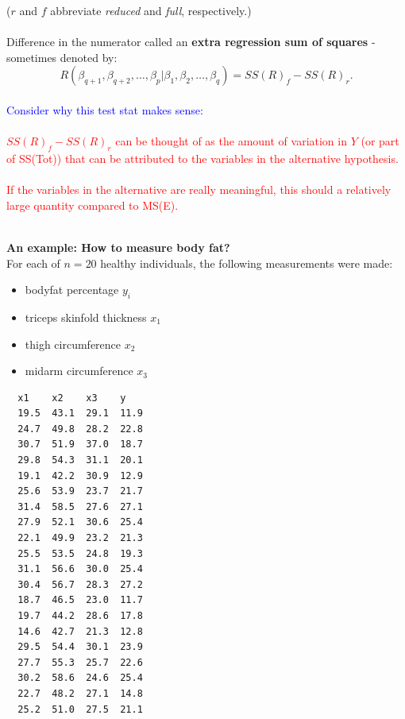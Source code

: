 ($r$ and $f$ abbreviate {\em reduced} and {\em full}, respectively.)\\~\\

Difference in the numerator called an \textbf{extra regression sum of squares} - sometimes denoted by:
$$ R(\beta_{q+1},\beta_{q+2},\ldots,\beta_p|\beta_{1},\beta_{2},\ldots,\beta_q) = SS(R)_f-SS(R)_r.$$~\\

\textcolor{blue}{Consider why this test stat makes sense:}\\~\\
\textcolor{red}{$SS(R)_f-SS(R)_r$ can be thought of as the amount of variation in $Y$ (or part of SS(Tot)) that can be attributed to the variables in the alternative hypothesis.  \\~\\
If the variables in the alternative are really meaningful, this should a relatively large quantity compared to MS(E).}\\~\\

\newpage

\textbf{An example: How to measure body fat?} \\
For each of $n=20$ healthy individuals, the following measurements were made:
\begin{itemize}
\item bodyfat percentage $y_i$
\item triceps skinfold thickness $x_{1}$
\item thigh circumference $x_{2}$
\item midarm circumference $x_{3}$
\end{itemize}

\begin{small}
\begin{verbatim}
  x1    x2    x3    y
  19.5  43.1  29.1  11.9
  24.7  49.8  28.2  22.8                   
  30.7  51.9  37.0  18.7                   
  29.8  54.3  31.1  20.1                   
  19.1  42.2  30.9  12.9                   
  25.6  53.9  23.7  21.7
  31.4  58.5  27.6  27.1
  27.9  52.1  30.6  25.4
  22.1  49.9  23.2  21.3
  25.5  53.5  24.8  19.3
  31.1  56.6  30.0  25.4
  30.4  56.7  28.3  27.2
  18.7  46.5  23.0  11.7
  19.7  44.2  28.6  17.8
  14.6  42.7  21.3  12.8
  29.5  54.4  30.1  23.9
  27.7  55.3  25.7  22.6
  30.2  58.6  24.6  25.4
  22.7  48.2  27.1  14.8
  25.2  51.0  27.5  21.1
\end{verbatim}
\end{small}

